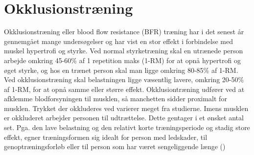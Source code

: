 \section{Okklusionstræning}
Okklusionstræning eller blood flow resistance (BFR) træning har i det senest år gennemgået mange undersøgelser og har vist en stor effekt i forbindelse med muskel hypertrofi og styrke. Ved normal styrketræning skal en utrænede person arbejde omkring 45-60\% af 1 repetition maks (1-RM) for at opnå hypertrofi og øget styrke, og hos en trænet person skal man ligge omkring 80-85\% af 1-RM. Ved okklusionstræning skal belastningen ligge væsentlig lavere, omkring 20-50\% af 1-RM, for at opnå samme eller større effekt. 
Okklusiontræning udfører ved at afklemme blodforsyningen til musklen, så manchetten sidder proximalt for musklen. Trykket der okkluderes ved varierer meget fra studierne. Imens musklen er okkluderet arbejder personen til udtrættelse. Dette gentager i et ønsket antal set. 
Pga. den lave belastning og den relativt korte træningsperiode og stadig store effekt, egner træningsformen sig idealt for person med ledskader, til genoptræningsforløb eller til person som har været sengeliggende længe (\cite{RefWorks:38})









